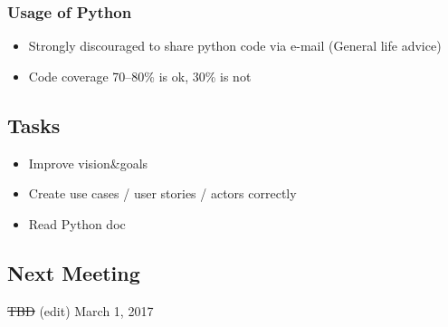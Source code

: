 	\subsubsection{Usage of Python}
	\begin{itemize}
		\item Strongly discouraged to share python code via e-mail (General life advice)
		\item Code coverage 70--80\% is ok, 30\% is not
        \end{itemize}
\subsection*{Tasks}
	\begin{itemize}
		\item Improve vision\&goals
		\item Create use cases / user stories / actors correctly
		\item Read Python doc
	\end{itemize}
\subsection*{Next Meeting}
\st{TBD} (edit)
March 1, 2017
